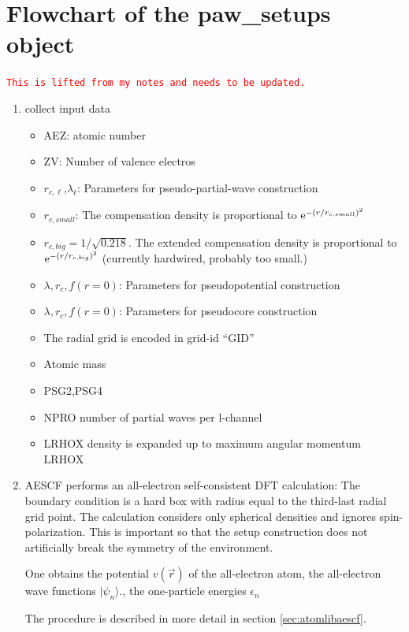 \documentclass[11pt,a4paper]{report}
\newcommand{\petertt}[1]{\textcolor{red}{\texttt{#1}}}
\begin{document}
\section{Flowchart of the paw\_setups object}
\petertt{This is lifted from my notes and needs to be updated.}


\begin{enumerate}
\item collect input data
\begin{itemize}
\item AEZ: atomic number
\item ZV:  Number of valence electros
\item $r_{c,\ell}$,$\lambda_\ell$: Parameters for pseudo-partial-wave
  construction
\item $r_{c,small}$: The compensation density is proportional to
  $\mathrm{e}^{-(r/r_{c,small})^2}$
\item $r_{c,big}=1/\sqrt{0.218}$. The extended compensation density is
  proportional to $\mathrm{e}^{-(r/r_{c,big})^2}$ (currently hardwired,
  probably too small.)
\item $\lambda,r_c,f(r=0)$: Parameters for pseudopotential construction 
\item $\lambda,r_c,f(r=0)$: Parameters for pseudocore construction 
\item The radial grid is encoded in grid-id ``GID''
\item Atomic mass
\item PSG2,PSG4
\item NPRO number of partial waves per l-channel
\item LRHOX density is expanded up to maximum angular momentum LRHOX
\end{itemize}
\item AESCF performs an all-electron self-consistent DFT calculation: The
  boundary condition is a hard box with radius equal to the third-last
  radial grid point. The calculation considers only spherical
  densities and ignores spin-polarization. This is important so that the
  setup construction does not artificially break the symmetry of the
  environment.

  One obtains the potential $v(\vec{r})$ of the all-electron atom, the
  all-electron wave functions $|\psi_n\rangle$., the one-particle
  energies $\epsilon_n$

  The procedure is described in more detail in section
  \ref{sec:atomlibaescf}.


\end{enumerate}
\end{document}
